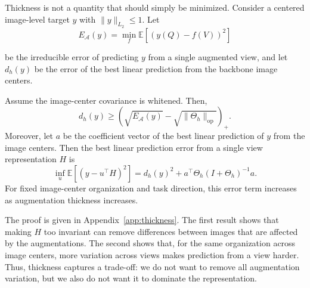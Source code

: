 Thickness is not a quantity that should simply be minimized. Consider a centered image-level target $y$ with $\|y\|_{L_2}\leq1$. Let
\begin{equation}
    E_{\mathcal A}(y)
    =
    \min_f
    \mathbb{E}\!\left[(y(Q)-f(V))^2\right]
\end{equation}

be the irreducible error of predicting $y$ from a single augmented view, and let $d_h(y)$ be the error of the best linear prediction from the backbone image centers.

\begin{theorem}
\label{thm:thickness}
Assume the image-center covariance is whitened. Then,
\begin{equation}
    d_h(y)
    \geq
    \left(
        \sqrt{E_{\mathcal A}(y)}
        -
        \sqrt{\|\Theta_h\|_{\mathrm{op}}}
    \right)_+ .
    \label{eq:too-thin}
\end{equation}
Moreover, let $a$ be the coefficient vector of the best linear prediction of $y$ from the image centers. Then the best linear prediction error from a single view representation $H$ is
\begin{equation}
    \inf_u
    \mathbb{E}\!\left[(y-u^\top H)^2\right]
    =
    d_h(y)^2
    +
    a^\top
    \Theta_h (I+\Theta_h)^{-1} a.
    \label{eq:too-thick}
\end{equation}
For fixed image-center organization and task direction, this error term increases as augmentation thickness increases.
\end{theorem}

The proof is given in Appendix~\ref{app:thickness}. The first result shows that making $H$ too invariant can remove differences between images that are affected by the augmentations. The second shows that, for the same organization across image centers, more variation across views makes prediction from a view harder. Thus, thickness captures a trade-off: we do not want to remove all augmentation variation, but we also do not want it to dominate the representation.

